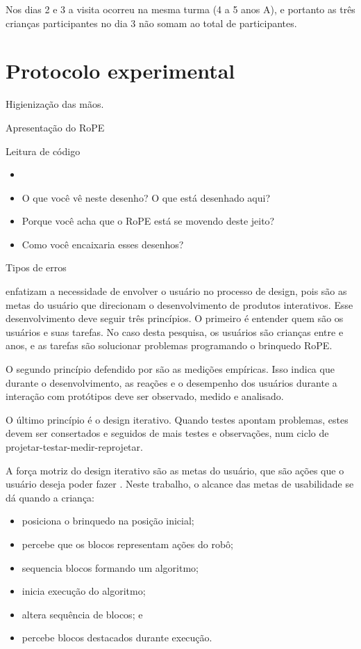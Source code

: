 Nos dias 2 e 3 a visita ocorreu na mesma turma (4 a 5 anos A), e portanto as três crianças participantes no dia 3 não somam ao total de participantes. 

\section{Protocolo experimental}
\label{sec:protocolo}
Higienização das mãos.

Apresentação do RoPE

Leitura de código
\begin{itemize}
\item 
\item O que você vê neste desenho? O que está desenhado aqui?
\item Porque você acha que o RoPE está se movendo deste jeito?
\item Como você encaixaria esses desenhos?
\end{itemize}

Tipos de erros



 enfatizam a necessidade de envolver o usuário no processo de design, pois são as metas do usuário que direcionam o desenvolvimento de produtos interativos. Esse desenvolvimento deve seguir três princípios. O primeiro é entender quem são os usuários e suas tarefas. No caso desta pesquisa, os usuários são crianças entre \idadeinicial e \idadefinal anos, e as tarefas são solucionar problemas programando o brinquedo RoPE. 

O segundo princípio defendido por  são as medições empíricas. Isso indica que durante o desenvolvimento, as reações e o desempenho dos usuários durante a interação com protótipos deve ser observado, medido e analisado. 

O último princípio é o design iterativo. Quando testes apontam problemas, estes devem ser consertados e seguidos de mais testes e observações, num ciclo de projetar-testar-medir-reprojetar. 

A força motriz do design iterativo são as metas do usuário, que são ações que o usuário deseja poder fazer \cite{rogers_design_2013}. Neste trabalho, o alcance das metas de usabilidade se dá quando a criança:

\begin{itemize}
    \item posiciona o brinquedo na posição inicial;
    \item percebe que os blocos representam ações do robô;
    \item sequencia blocos formando um algoritmo;
    \item inicia execução do algoritmo;
    \item altera sequência de blocos; e
    \item percebe blocos destacados durante execução.
\end{itemize}

